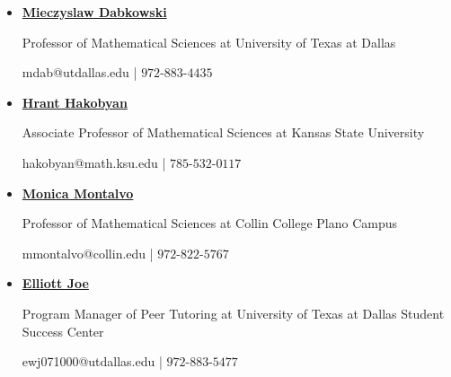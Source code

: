 \documentclass{article}
\begin{document}
\thispagestyle{empty}
\begin{itemize}
    \item \href{https://profiles.utdallas.edu/mdab}{{\Large \textbf{Mieczyslaw Dabkowski}}} 
    
    Professor of Mathematical Sciences at University of Texas at Dallas
    
    mdab@utdallas.edu | $972$-$883$-$4435$ \medskip




    \item \href{https://www.math.ksu.edu/~hakobyan/}{{\Large \textbf{Hrant Hakobyan}} }

    Associate Professor of Mathematical Sciences at Kansas State University
    
    hakobyan@math.ksu.edu | $785$-$532$-$0117$ \medskip

    \item \href{https://www.collin.edu/department/math/faculty.html}{{\Large \textbf{Monica Montalvo}}}

    Professor of Mathematical Sciences at Collin College Plano Campus 
    
    mmontalvo@collin.edu | $972$-$822$-$5767$ \medskip

    \item \href{https://studentsuccess.utdallas.edu/about-the-ssc/meet-the-staff/}{{\Large \textbf{Elliott Joe}}}

     Program Manager of Peer Tutoring at University of Texas at Dallas Student Success Center
     
     ewj071000@utdallas.edu | $972$-$883$-$5477$
    
    
\end{itemize}
\end{document}
